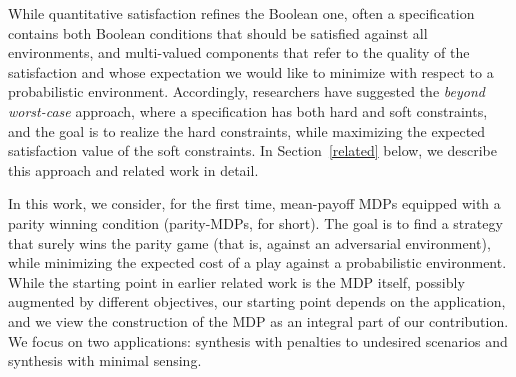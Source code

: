 \documentclass[runningheads,a4paper]{llncs}
\begin{document}
While quantitative satisfaction refines the Boolean one, often a specification contains both Boolean conditions that should be satisfied against all environments, and multi-valued components that refer to the quality of the satisfaction and whose expectation we would like to minimize with respect to a probabilistic environment. Accordingly, 
researchers have suggested the {\em beyond worst-case} approach, where a specification has both hard and soft constraints, and the goal is to realize the hard constraints, while maximizing the expected satisfaction value of the soft constraints. In Section~\ref{related} below, we describe this approach and related work in detail.

In this work, we consider, for the first time, mean-payoff MDPs equipped with a parity winning condition (parity-MDPs, for short). The goal is to find a strategy that surely wins the parity game (that is, against an adversarial environment), while minimizing the expected cost of a play against a probabilistic environment. 
While the starting point in earlier related work is the MDP itself, possibly augmented by different objectives, 
our starting point depends on the application, and we view the construction of the MDP as an integral part of our contribution. We focus on two applications: synthesis with penalties to undesired scenarios and synthesis with minimal sensing.
\end{document}
